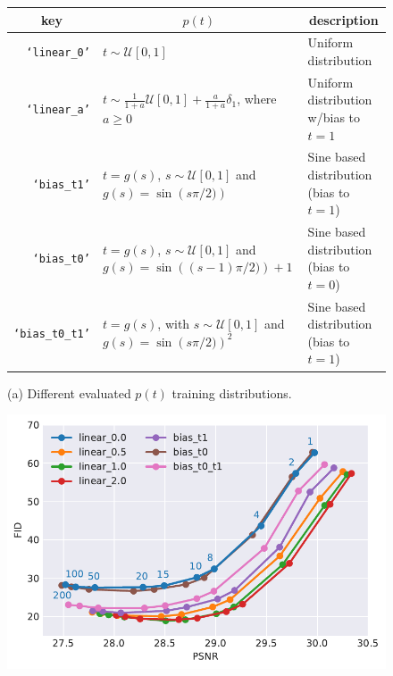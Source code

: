 \begin{figure}[t]
    \centering
    \begin{minipage}[c]{\textwidth}
    \centering
    \small
    \begin{tabular}{rll}
    \multicolumn{1}{c}{key} & \multicolumn{1}{c}{$p(t)$} & \multicolumn{1}{c}{description} \\ \midrule
         \texttt{`linear\_0'} &  $t \sim \mathcal{U}[0,1]$ & Uniform distribution \\
         \texttt{`linear\_a'} &   $t \sim \frac{1}{1+a}\mathcal{U}[0,1] + \frac{a}{1+a}\delta_1$, where $a \ge 0$ & Uniform distribution w/bias to $t=1$\\
         \texttt{`bias\_t1'} &   $t = g(s)$, $s \sim \mathcal{U}[0,1]$ and $g(s) = \sin\left(s\pi/2)\right)$ & Sine based distribution (bias to $t=1$) \\     
         \texttt{`bias\_t0'} &   $t = g(s)$, $s \sim \mathcal{U}[0,1]$ and $g(s) = \sin\left((s-1)\pi/2)\right) + 1$ & Sine based distribution (bias to $t=0$) \\
         \texttt{`bias\_t0\_t1'} &   $t = g(s)$, with $s \sim \mathcal{U}[0,1]$ and $g(s) = \sin\left(s\pi/2)\right)^2$ & Sine based distribution (bias to $t=1$)   
    \end{tabular}\vspace{.5em}
    
    (a) Different evaluated $p(t)$ training distributions.
    \end{minipage} \vspace{1em}

    \begin{minipage}[c]{.47\textwidth}
    \centering\small
    \includegraphics[width=0.9\linewidth]{assets/pd_curve_dejpeg_q15_distro_fid.pdf}
    

\end{minipage}
\end{figure}
